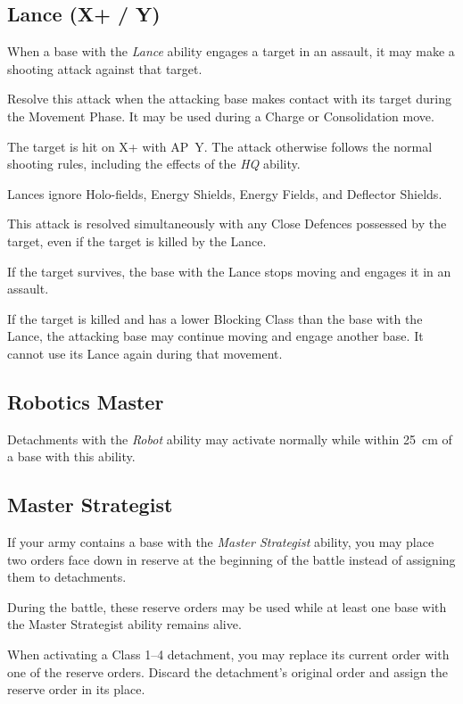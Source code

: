 \subsection{Lance (X+ / Y)}

When a base with the \textit{Lance} ability engages a target in an assault, it may make a shooting attack against that target.

Resolve this attack when the attacking base makes contact with its target during the Movement Phase. It may be used during a Charge or Consolidation move.

The target is hit on X+ with AP~Y. The attack otherwise follows the normal shooting rules, including the effects of the \textit{HQ} ability.

Lances ignore Holo-fields, Energy Shields, Energy Fields, and Deflector Shields.

This attack is resolved simultaneously with any Close Defences possessed by the target, even if the target is killed by the Lance.

If the target survives, the base with the Lance stops moving and engages it in an assault.

If the target is killed and has a lower Blocking Class than the base with the Lance, the attacking base may continue moving and engage another base. It cannot use its Lance again during that movement.

\subsection{Robotics Master}

Detachments with the \textit{Robot} ability may activate normally while within 25~cm of a base with this ability.

\subsection{Master Strategist}

If your army contains a base with the \textit{Master Strategist} ability, you may place two orders face down in reserve at the beginning of the battle instead of assigning them to detachments.

During the battle, these reserve orders may be used while at least one base with the Master Strategist ability remains alive.

When activating a Class 1--4 detachment, you may replace its current order with one of the reserve orders. Discard the detachment's original order and assign the reserve order in its place.

